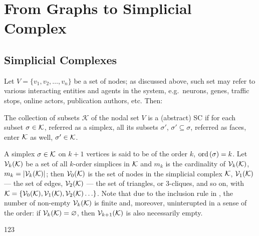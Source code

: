 \section{ From Graphs to Simplicial Complex }


\subsection{ Simplicial Complexes }


Let \( V = \{ v_1, v_2, \ldots, v_n \} \) be a set of nodes; as discussed above, such set may refer to various interacting entities and agents in the system, e.g.\ neurons, genes, traffic stops, online actors, publication authors, etc. Then: 

\begin{definition}\label{def:simplicial_complex}
      The collection of subsets \( \mathcal K \) of the nodal set \( V \) is  a (abstract) \gls{SC} if for each subset \( \sigma \in \mathcal{K} \), referred as a \gls{simplex}, all its subsets \( \sigma'\), \( \sigma' \subseteq \sigma \), referred as \glspl{face}, enter \( \mathcal{K} \) as well, \( \sigma' \in \mathcal{K}\).
\end{definition}

A simplex \( \sigma \in \mathcal{K} \) on \( k + 1 \) vertices is said to be of the order \( k \), \( \mathrm{ord}\,(\sigma) = k \). Let \( \mathcal{V}_{k}(\mathcal{K}) \) be a set of all \(k\)-order simplices in \( \mathcal{K} \) and \( m_k \) is the cardinality of \( \mathcal{V}_{k}(\mathcal{K})\), \( m_k = | \mathcal{V}_{k}(\mathcal{K}) | \); then \( \mathcal{V}_{0}(\mathcal{K}) \) is the set of nodes in the simplicial complex \( \mathcal{K} \), \( \mathcal{V}_{1}(\mathcal{K}) \) --- the set of edges, \( \mathcal{V}_{2}(\mathcal{K}) \) --- the set of triangles, or \(3\)-cliques, and so on, with \( \mathcal{K} = \{ \mathcal{V}_{0}(\mathcal{K}), \mathcal{V}_{1}(\mathcal{K}), \mathcal{V}_{2}(\mathcal{K}) \ldots \} \). Note that due to the inclusion rule in , the number of non-empty \( \mathcal{V}_{k}(\mathcal{K}) \) is finite and, moreover, uninterupted in a sense of the order: if \( \mathcal{V}_{k}(\mathcal{K}) = \varnothing \), then \( \mathcal{V}_{k+1}(\mathcal{K}) \) is also necessarily empty.

\begin{example}

      123
      
\end{example}



